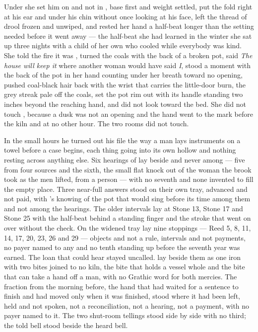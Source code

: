 Under  she set him on  and not in , base first and weight settled, put the fold right at his ear and under his chin without once looking at his face, left the thread of drool frozen and unwiped, and rested her hand a half-beat longer than the setting needed before it went away --- the half-beat she had learned in the winter she sat up three nights with a child of her own who cooled while everybody was kind. She told the fire it was , turned the coals with the back of a broken pot, said \emph{The house will keep it} where another woman would have said \emph{I}, stood a moment with the back of the pot in her hand counting under her breath toward no opening, pushed coal-black hair back with the wrist that carries the little-door burn, the grey streak pale off the coals, set the pot rim out with its handle standing two inches beyond the reaching hand, and did not look toward the bed. She did not touch , because a dusk was not an opening and the hand went to the mark before the kiln and at no other hour. The two rooms did not touch.

In the small hours he turned out his file the way a man lays instruments on a towel before a case begins, each thing going into its own hollow and nothing resting across anything else. Six hearings of  lay beside and never among --- five from four sources and the sixth, the small flat knock out of the woman the brook took as the men lifted, from a person --- with no seventh and none invented to fill the empty place. Three near-full answers stood on their own tray, advanced and not paid, with 's knowing of the pot that would sing before its time among them and not among the hearings. The older intervals lay at Stone 13, Stone 17 and Stone 25 with the half-beat behind a standing finger and the stroke that went on over  without the check. On the widened tray lay nine stoppings --- Reed 5, 8, 11, 14, 17, 20, 23, 26 and 29 --- objects and not a rule, intervals and not payments, no payer named to any and no tenth standing up before the seventh year was earned. The loan that could hear stayed uncalled.  lay beside them as one iron with two bites joined to no kiln, the bite that holds a vessel whole and the bite that can take a hand off a man, with no Grathic word for both mercies. The fraction from the morning before, the hand that had waited for a sentence to finish and had moved only when it was finished, stood where it had been left, held and not spoken, not a reconciliation, not a hearing, not a payment, with no payer named to it. The two shut-room tellings stood side by side with no third; the told bell stood beside the heard bell.

